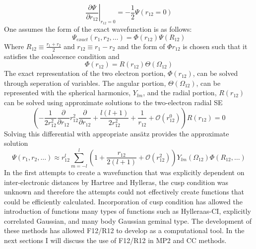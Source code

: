       \begin{equation}
          \left. \frac{\partial \Psi}{\partial r_{12}} \right |_{r_{12}=0} = - \frac{1}{2} \Psi(r_{12}=0)
        \end{equation}
    One assumes the form of the exact wavefunction is as follows:
      \begin{equation}
        \Psi_{exact}(r_1, r_2 , \dots) = \Phi(r_{12})\Psi(R_{12})
      \end{equation}
    Where $R_{12} \equiv \frac{r_1 + r_2}{2}$ and $r_{12} \equiv r_1 - r_2$ and the form of $\Phi{r_{12}}$ is chosen such that it satisfies the coalescence condition and 
      \begin{equation}
        \Phi(r_{12}) = R(r_{12})\Theta(\Omega_{12})
      \end{equation}
    The exact representation of the two electron portion, $\Phi(r_{12})$, can be solved through seperation of variables.  The angular portion, $\Theta(\Omega_{12})$, can be represented with the spherical harmonics, $Y_{lm}$, and the radial portion, $R(r_{12})$ can be solved using approximate solutions to the two-electron radial SE
      \begin{equation}
        \left( -\frac{1}{2r^2_{12}} \frac{\partial}{\partial r_{12}} r^2_{12} \frac{\partial}{\partial r_{12}} + \frac{l(l+1)}{2r^2_{12}} + \frac{1}{r_{12}} + \mathcal{O}(r^0_{12}) \right) R(r_{12}) = 0
      \end{equation}
    Solving this differential with appropriate ans{\"a}tz provides the approximate solution
      \begin{equation}
        \Psi(r_1, r_2, \dots) \approx r^l_{12} \sum_{m=-l}^l\left( 1 + \frac{r_{12}}{2(l+1)} + \mathcal{O}(r^2_{12})\right) Y_{lm}(\Omega_{12})\Phi(R_{12},\dots)
      \end{equation}
    In the first attempts to create a wavefunction that was explicitly dependent on inter-electronic distances by Hartree \cite{Hartree 1928} and Hylleras\cite{Hylleras 1929}, the cusp condition was unknown and therefore the attempts could not effectively create functions that could be efficiently calculated.  Incorporation of cusp condition has allowed the introduction of functions many types of functions such as Hylleraas-CI, explicitly correlated Gaussian, and many body Gaussian geminal type.\cite{Kong 2012}  The development of these methods has allowed F12/R12 to develop as a computational tool.
    In the next sections I will discuss the use of F12/R12 in MP2 and CC methods.
